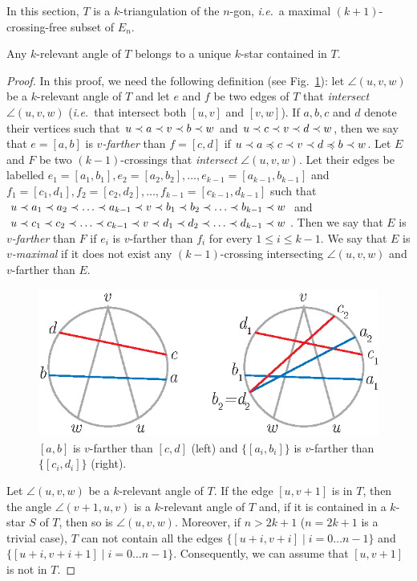 \documentclass[12pt]{amsart}
\begin{document}
In this section, $T$ is a $k$-triangulation of the $n$-gon, {\it i.e.}~a maximal $(k+1)$-crossing-free subset of $E_n$.

\begin{theorem}\label{angle}
Any $k$-relevant angle of $T$ belongs to a unique $k$-star contained in $T$.
\end{theorem}


\begin{proof}
In this proof, we need the following definition (see Fig.~\ref{farther}): let $\angle(u,v,w)$ be a $k$-relevant angle of $T$ and let $e$ and $f$ be two edges of $T$ that \emph{intersect} $\angle(u,v,w)$ ({\it i.e.}~that intersect both $[u,v]$ and $[v,w]$). If $a,b,c$ and $d$ denote their vertices such that $u\prec a\prec v\prec b\prec w$ and $u\prec c\prec v\prec d\prec w$, then we say that $e=[a,b]$ is \emph{$v$-farther} than $f=[c,d]$ if $u\prec a\preccurlyeq c\prec v\prec d\preccurlyeq b\prec w$. Let $E$ and $F$ be two $(k-1)$-crossings that \emph{intersect} $\angle(u,v,w)$. Let their edges be labelled $e_1=[a_1,b_1],e_2=[a_2,b_2],\ldots,e_{k-1}=[a_{k-1},b_{k-1}]$ and $f_1=[c_1,d_1],f_2=[c_2,d_2],\ldots,f_{k-1}=[c_{k-1},d_{k-1}]$ such that $u\prec a_1\prec a_2\prec \ldots\prec a_{k-1}\prec v\prec b_1\prec b_2\prec \ldots\prec b_{k-1}\prec w$ and $u\prec c_1\prec c_2\prec \ldots\prec c_{k-1}\prec v\prec d_1\prec d_2\prec \ldots\prec d_{k-1}\prec w$. Then we say that $E$ is \emph{$v$-farther} than $F$ if $e_i$ is $v$-farther than $f_i$ for every $1\le i\le k-1$. We say that $E$ is \emph{$v$-maximal} if it does not exist any $(k-1)$-crossing intersecting $\angle(u,v,w)$ and $v$-farther than $E$.

\begin{figure}
\centerline{\includegraphics[scale=1]{farther.eps}}
\caption{\small{$[a,b]$ is $v$-farther than $[c,d]$ (left) and $\{[a_i,b_i]\}$ is $v$-farther than $\{[c_i,d_i]\}$ (right).}}\label{farther}
\end{figure}

Let $\angle(u,v,w)$ be a $k$-relevant angle of $T$. 
If the edge $[u,v+1]$ is in $T$, then the angle $\angle(v+1,u,v)$ is a $k$-relevant angle of $T$ and, if it is contained in a $k$-star $S$ of $T$, then so is $\angle(u,v,w)$. Moreover, if $n>2k+1$ ($n=2k+1$ is a trivial case), $T$ can not contain all the edges $\{[u+i,v+i]\;|\; i=0\ldots n-1\}$ and $\{[u+i,v+i+1]\;|\; i=0\ldots n-1\}$. Consequently, we can assume that $[u,v+1]$ is not in $T$.


\end{proof}
\end{document}
